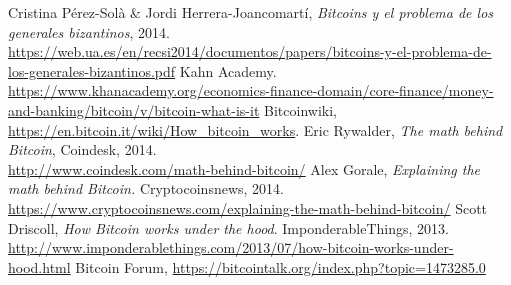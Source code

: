 \documentclass[twoside]{article}
\theoremstyle{definition}
\begin{document}
\newpage
\begin{thebibliography}{}
 Cristina Pérez-Solà \& Jordi Herrera-Joancomartí, \textit{Bitcoins y el problema de los generales bizantinos}, 2014. \url{https://web.ua.es/en/recsi2014/documentos/papers/bitcoins-y-el-problema-de-los-generales-bizantinos.pdf}
 Kahn Academy. \url{https://www.khanacademy.org/economics-finance-domain/core-finance/money-and-banking/bitcoin/v/bitcoin-what-is-it}
 Bitcoinwiki, \url{https://en.bitcoin.it/wiki/How_bitcoin_works}.
 Eric Rywalder, \textit{The math behind Bitcoin}, Coindesk, 2014.\\ \url{http://www.coindesk.com/math-behind-bitcoin/}
 Alex Gorale, \textit{Explaining the math behind Bitcoin.} Cryptocoinsnews, 2014.\\ \url{https://www.cryptocoinsnews.com/explaining-the-math-behind-bitcoin/}
 Scott Driscoll, \textit{How Bitcoin works under the hood}. ImponderableThings, 2013. \url{http://www.imponderablethings.com/2013/07/how-bitcoin-works-under-hood.html}
 Bitcoin Forum, \url{https://bitcointalk.org/index.php?topic=1473285.0}
\end{thebibliography}
\end{document}
